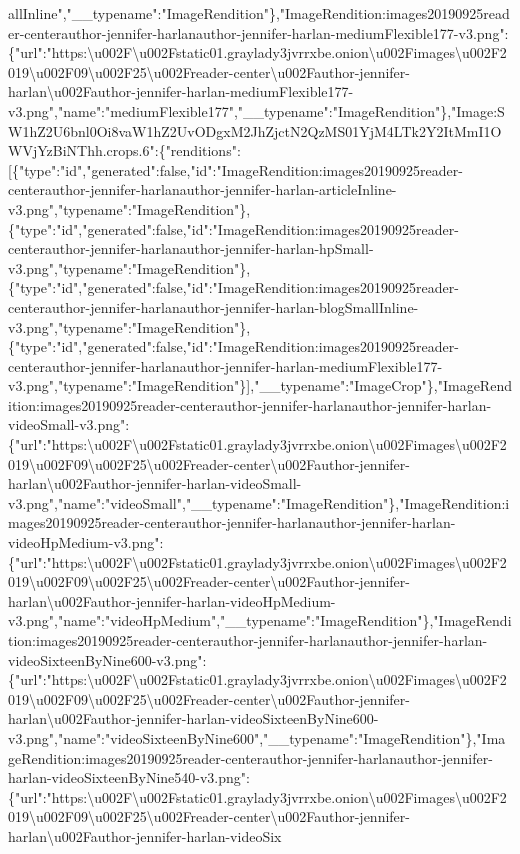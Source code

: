 allInline","\_\_typename":"ImageRendition"\},"ImageRendition:images20190925reader-centerauthor-jennifer-harlanauthor-jennifer-harlan-mediumFlexible177-v3.png":\{"url":"https:\textbackslash{}u002F\textbackslash{}u002Fstatic01.graylady3jvrrxbe.onion\textbackslash{}u002Fimages\textbackslash{}u002F2019\textbackslash{}u002F09\textbackslash{}u002F25\textbackslash{}u002Freader-center\textbackslash{}u002Fauthor-jennifer-harlan\textbackslash{}u002Fauthor-jennifer-harlan-mediumFlexible177-v3.png","name":"mediumFlexible177","\_\_typename":"ImageRendition"\},"Image:SW1hZ2U6bnl0Oi8vaW1hZ2UvODgxM2JhZjctN2QzMS01YjM4LTk2Y2ItMmI1OWVjYzBiNThh.crops.6":\{"renditions":{[}\{"type":"id","generated":false,"id":"ImageRendition:images20190925reader-centerauthor-jennifer-harlanauthor-jennifer-harlan-articleInline-v3.png","typename":"ImageRendition"\},\{"type":"id","generated":false,"id":"ImageRendition:images20190925reader-centerauthor-jennifer-harlanauthor-jennifer-harlan-hpSmall-v3.png","typename":"ImageRendition"\},\{"type":"id","generated":false,"id":"ImageRendition:images20190925reader-centerauthor-jennifer-harlanauthor-jennifer-harlan-blogSmallInline-v3.png","typename":"ImageRendition"\},\{"type":"id","generated":false,"id":"ImageRendition:images20190925reader-centerauthor-jennifer-harlanauthor-jennifer-harlan-mediumFlexible177-v3.png","typename":"ImageRendition"\}{]},"\_\_typename":"ImageCrop"\},"ImageRendition:images20190925reader-centerauthor-jennifer-harlanauthor-jennifer-harlan-videoSmall-v3.png":\{"url":"https:\textbackslash{}u002F\textbackslash{}u002Fstatic01.graylady3jvrrxbe.onion\textbackslash{}u002Fimages\textbackslash{}u002F2019\textbackslash{}u002F09\textbackslash{}u002F25\textbackslash{}u002Freader-center\textbackslash{}u002Fauthor-jennifer-harlan\textbackslash{}u002Fauthor-jennifer-harlan-videoSmall-v3.png","name":"videoSmall","\_\_typename":"ImageRendition"\},"ImageRendition:images20190925reader-centerauthor-jennifer-harlanauthor-jennifer-harlan-videoHpMedium-v3.png":\{"url":"https:\textbackslash{}u002F\textbackslash{}u002Fstatic01.graylady3jvrrxbe.onion\textbackslash{}u002Fimages\textbackslash{}u002F2019\textbackslash{}u002F09\textbackslash{}u002F25\textbackslash{}u002Freader-center\textbackslash{}u002Fauthor-jennifer-harlan\textbackslash{}u002Fauthor-jennifer-harlan-videoHpMedium-v3.png","name":"videoHpMedium","\_\_typename":"ImageRendition"\},"ImageRendition:images20190925reader-centerauthor-jennifer-harlanauthor-jennifer-harlan-videoSixteenByNine600-v3.png":\{"url":"https:\textbackslash{}u002F\textbackslash{}u002Fstatic01.graylady3jvrrxbe.onion\textbackslash{}u002Fimages\textbackslash{}u002F2019\textbackslash{}u002F09\textbackslash{}u002F25\textbackslash{}u002Freader-center\textbackslash{}u002Fauthor-jennifer-harlan\textbackslash{}u002Fauthor-jennifer-harlan-videoSixteenByNine600-v3.png","name":"videoSixteenByNine600","\_\_typename":"ImageRendition"\},"ImageRendition:images20190925reader-centerauthor-jennifer-harlanauthor-jennifer-harlan-videoSixteenByNine540-v3.png":\{"url":"https:\textbackslash{}u002F\textbackslash{}u002Fstatic01.graylady3jvrrxbe.onion\textbackslash{}u002Fimages\textbackslash{}u002F2019\textbackslash{}u002F09\textbackslash{}u002F25\textbackslash{}u002Freader-center\textbackslash{}u002Fauthor-jennifer-harlan\textbackslash{}u002Fauthor-jennifer-harlan-videoSix